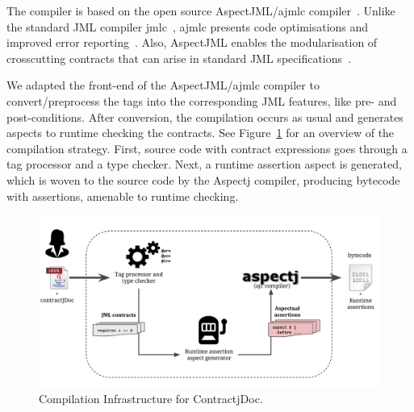 The \contractjdoc{} compiler is based on the open source AspectJML/ajmlc compiler~\cite{aspectjml,ajmlc,Rebelo-etal08}.
Unlike the standard JML compiler jmlc~\cite{jmlc-compiler}, ajmlc presents code optimisations and improved error reporting~\cite{ajmlc}.
Also, AspectJML enables the modularisation
of crosscutting contracts that can arise in standard
JML specifications~\cite{aspectjml}.

We adapted the front-end of the AspectJML/ajmlc compiler to convert/preprocess the \contractjdoc{} tags into the corresponding JML features, like pre- and post-conditions.
After conversion, the compilation occurs as usual and generates aspects to runtime checking the
contracts. See Figure~\ref{fig:compilerInfra}
for an overview of the compilation strategy.
First, source code with \contractjdoc{}
contract expressions goes through a tag processor and a type checker. Next, a runtime assertion aspect is generated, which is woven to the source code by the Aspectj compiler, producing bytecode with assertions, amenable to runtime checking.


\begin{figure}[h]
\centering
\includegraphics[width=1.0\textwidth]{figs/compilerInfra}
\caption{Compilation Infrastructure for ContractjDoc.}
\label{fig:compilerInfra}
\end{figure}

